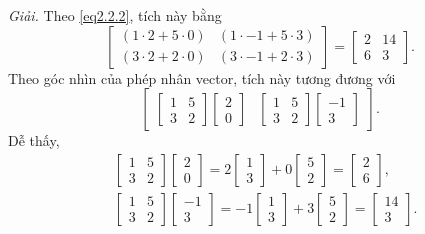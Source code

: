 \emph{Giải.} Theo \eqref{eq2.2.2}, tích này bằng 
\[\begin{bmatrix}
    (1\cdot 2+5\cdot 0)&(1\cdot -1+5\cdot 3)\\
   ( 3\cdot 2+2\cdot 0)&(3\cdot -1+2\cdot 3)
\end{bmatrix}=\begin{bmatrix}
    2&14\\
    6&3
\end{bmatrix}.\]
Theo góc nhìn của phép nhân vector, tích này tương đương với 
\[\begin{bmatrix}
    \begin{bmatrix}
        1&5\\3&2
    \end{bmatrix}\begin{bmatrix}
        2\\0
    \end{bmatrix} &\begin{bmatrix}
        1&5\\3&2
    \end{bmatrix}\begin{bmatrix}
        -1\\3
    \end{bmatrix}
\end{bmatrix}.\]
Dễ thấy, \begin{align*}
    &\begin{bmatrix}
        1&5\\3&2
    \end{bmatrix}\begin{bmatrix}
        2\\0
    \end{bmatrix}=2\begin{bmatrix}
        1\\3
    \end{bmatrix}+0\begin{bmatrix}
        5\\2
    \end{bmatrix}=\begin{bmatrix}
        2\\6
    \end{bmatrix},\\
    &\begin{bmatrix}
        1&5\\3&2
    \end{bmatrix}\begin{bmatrix}
        -1\\3
    \end{bmatrix}=-1\begin{bmatrix}
        1\\3
    \end{bmatrix}+3\begin{bmatrix}
        5\\2
    \end{bmatrix}=\begin{bmatrix}
        14\\3
    \end{bmatrix}.
\end{align*}
\vspace{8pt}


